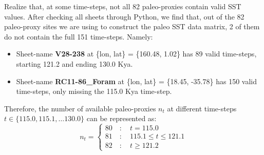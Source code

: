 \documentclass{article}
\begin{document}
Realize that, at some time-steps, not all 82 paleo-proxies contain valid SST values.
After checking all sheets through Python, we find that, out of the 82 paleo-proxy sites we are using to construct the paleo SST data matrix, 2 of them do not contain the full 151 time-steps. Namely:
    \begin{itemize}
        \item Sheet-name \textbf{V28-238} at \{lon, lat\} = \{160.48, 1.02\} has 89 valid time-steps, starting 121.2 and ending 130.0 Kya. 
        \item Sheet-name \textbf{RC11-86\_Foram} at \{lon, lat\} = \{18.45, -35.78\} has 150 valid time-steps, only missing the 115.0 Kya time-step. 
    \end{itemize}
Therefore, the number of available paleo-proxies $n_t$ at different time-steps $t \in \{115.0, 115.1, \dots 130.0\}$ can be represented as:
$$n_t = \begin{cases}
    80 \quad: \quad t = 115.0 \\
    81 \quad : \quad 115.1 \leq t \leq 121.1 \\
    82 \quad : \quad t \geq 121.2
    \end{cases}$$



\end{document}
